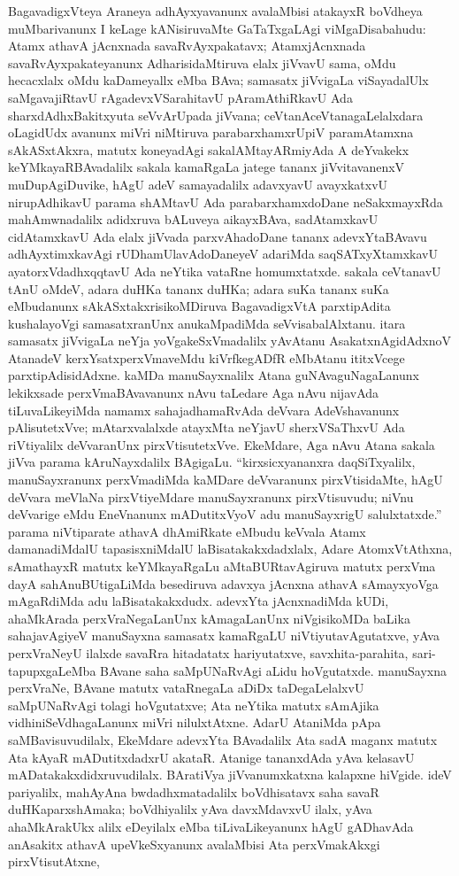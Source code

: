 BagavadigxVteya Araneya adhAyxyavanunx avalaMbisi atakayxR boVdheya muMbari\-vanunx I keLage kANisiruvaMte GaTaTxgaLAgi viMgaDisabahudu: Atamx athavA jAcnxnada savaRvAyxpakatavx; AtamxjAcnxnada savaRvAyxpakateyanunx AdharisidaMtiruva elalx jiVvavU sama, oMdu hecacxlalx oMdu kaDameyallx eMba BAva; samasatx jiVvigaLa viSaya\-dalUlx saMgavajiRtavU rAgadevxVSarahitavU pAramAthiRkavU Ada sharxdAdhxBakitxyuta seVvA\-rUpada jiVvana; ceVtanAceVtanagaLelalxdara oLagidUdx avanunx miVri niMtiruva para\-barxhamxrUpiV paramAtamxna sAkASxtAkxra, matutx koneyadAgi sakalAMtayARmiyAda A deYvakekx keYMkayaR\-BAvadalilx sakala kamaRgaLa jatege tananx jiVvitavanenxV muDupAgiDu\-vike, hAgU adeV samayadalilx adavxyavU avayxkatxvU nirupAdhikavU parama shAMtavU Ada parabarxhamxdoDane neSakxmayxRda mahAmwnadalilx adidxruva bALuveya aikayxBAva, sadAtamxkavU cidAtamxkavU Ada elalx jiVvada parxvAhadoDane tananx adevxYtaBAvavu adhAyx\-timxkavAgi rUDhamUlavAdoDaneyeV adariMda saqSATxyXtamxkavU ayatorxVdadhxqqtavU Ada neYtika vataRne homumxtatxde. sakala ceVtanavU tAnU oMdeV, adara duHKa tananx duHKa; adara suKa tananx suKa eMbudanunx sAkASxtakxrisikoMDiruva BagavadigxVtA parxtipAdita kushalayoVgi samasatxranUnx anukaMpadiMda seVvisabalAlxtanu. itara samasatx jiVvi\-gaLa neYja yoVgakeSxVmadalilx yAvAtanu AsakatxnAgidAdxnoV AtanadeV kerxYsatxperxVmaveMdu kiVrfkegADfR eMbAtanu ititxVcege parxtipAdisidAdxne. kaMDa manuSayxnalilx Atana guNAva\-guNagaLanunx lekikxsade perxVmaBAvavanunx nAvu taLedare Aga nAvu nijavAda tiLu\-vaLikeyiMda namamx sahajadhamaRvAda deVvara AdeVshavanunx pAlisutetxVve; mAtarxvalalxde atayxMta neYjavU sherxVSaThxvU Ada riVtiyalilx deVvaranUnx pirxVtisutetxVve. EkeMdare, Aga nAvu Atana sakala jiVva parama kAruNayxdalilx BAgigaLu. ``kirxsicxyananxra daqSiTxyalilx, manu\-Sayxranunx perxVmadiMda kaMDare deVvaranunx pirxVtisidaMte, hAgU deVvara meVlaNa pirxVtiyeMdare manuSayxranunx pirxVtisuvudu; niVnu deVvarige eMdu EneVnanunx mADutitxVyoV adu manuSayxrigU salulxtatxde.'' parama niVtiparate athavA dhAmiRkate eMbudu keVvala Atamx damanadiMdalU tapasisxniMdalU laBisatakakxdadxlalx, Adare AtomxVtAthxna, \hbox{sAmathayxR} matutx keYMkayaRgaLu aMtaBURtavAgiruva matutx perxVma dayA sahAnuBUti\-gaLiMda besediruva adavxya jAcnxna athavA sAmayxyoVga mAgaRdiMda adu laBisa\-takakxdudx. adevxYta jAcnxnadiMda kUDi, ahaMkArada perxVraNegaLanUnx kAmagaLanUnx niVgisi\-koMDa baLika sahajavAgiyeV manuSayxna samasatx kamaRgaLU niVtiyutavAgutatxve, yAva perxVraNeyU ilalxde savaRra hitadatatx hariyutatxve, savxhita-parahita, sari-tapupx\-gaLeMba BAvane saha saMpUNaRvAgi aLidu hoVgutatxde. manuSayxna perxVraNe, BAvane matutx vataRnegaLa aDiDx taDegaLelalxvU saMpUNaRvAgi tolagi hoVgutatxve; Ata neYtika matutx sAmAjika vidhiniSeVdhagaLanunx miVri nilulxtAtxne. AdarU AtaniMda pApa saMBavisuvudilalx, EkeMdare adevxYta BAvadalilx Ata sadA maganx matutx Ata kAyaR mADutitxdadxrU akataR. Atanige tananxdAda yAva kelasavU mADatakakxdidxruvudilalx. BAra\-tiVya jiVvanumxkatxna kalapxne hiVgide. ideV pariyalilx, mahAyAna bwdadhxmatadalilx boVdhisatavx saha savaR duHKaparxshAmaka; boVdhiyalilx yAva davxMdavxvU ilalx, yAva ahaMkArakUkx alilx eDeyilalx eMba tiLivaLikeyanunx hAgU gADhavAda anAsakitx athavA upeVkeSxyanunx avalaMbisi Ata perxVmakAkxgi pirxVtisutAtxne, 